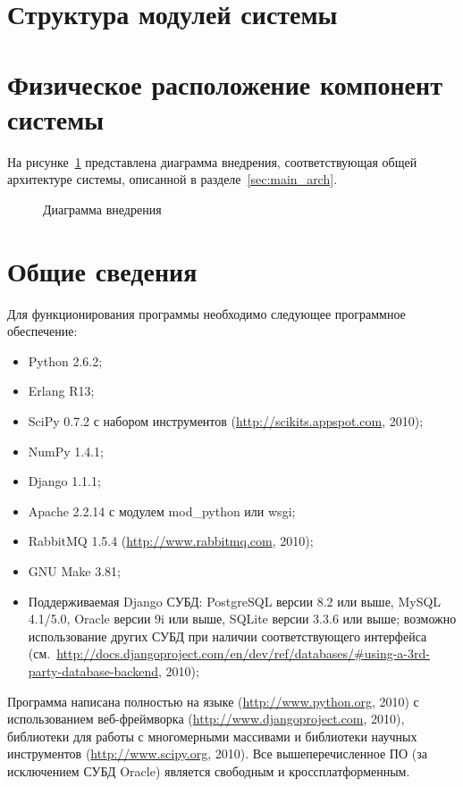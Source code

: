 \section{Структура модулей системы}

\section{Физическое расположение компонент системы}

На рисунке~\ref{fig:deployment} представлена диаграмма внедрения, соответствующая общей архитектуре системы, описанной в разделе~\ref{sec:main_arch}.

\begin{figure}
    \caption{Диаграмма внедрения}
    \label{fig:deployment}
\end{figure}


\section{Общие сведения}
\label{sec:soft_description:general}

Для функционирования программы необходимо следующее программное обеспечение:
\begin{itemize}
\item Python 2.6.2;
\item Erlang R13;
\item SciPy 0.7.2 с набором инструментов  (\url{http://scikits.appspot.com}, 2010);
\item NumPy 1.4.1;
\item Django 1.1.1;
\item Apache 2.2.14 с модулем mod\_python или wsgi;
\item RabbitMQ 1.5.4 (\url{http://www.rabbitmq.com}, 2010);
\item GNU Make 3.81;
\item Поддерживаемая Django СУБД: PostgreSQL версии 8.2 или выше, MySQL 4.1/5.0, Oracle версии 9i или выше, SQLite версии 3.3.6 или выше; возможно использование других СУБД при наличии соответствующего интерфейса (см.~\url{http://docs.djangoproject.com/en/dev/ref/databases/#using-a-3rd-party-database-backend}, 2010);
\end{itemize}

Программа написана полностью на языке  (\url{http://www.python.org}, 2010) с использованием веб-фреймворка  (\url{http://www.djangoproject.com}, 2010), библиотеки для работы с многомерными массивами  и библиотеки научных инструментов  (\url{http://www.scipy.org}, 2010). Все вышеперечисленное ПО (за исключением СУБД Oracle) является свободным и кроссплатформенным.

